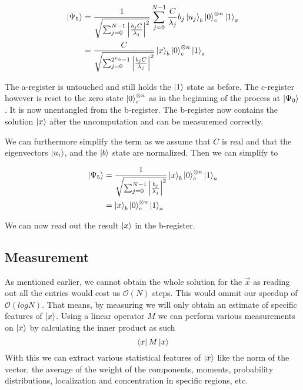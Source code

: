 \begin{equation}
\begin{split}
\ket{\Psi_5} &= \frac {1} {\sqrt{\sum_{j=0}^{N-1} \left| \frac{b_jC} {\lambda_j}\right|^2}}
\sum_{j=0}^{N-1}\frac{ C}{\lambda_j}   b_j \ket{u_j}_b \ket{0}_c^{\otimes n} \ket{1}_a\\
&= \frac {C} {\sqrt{\sum_{j=0}^{2^{n_b}-1} \left| \frac{b_jC} {\lambda_j}\right|^2}}
\ket{x}_b \ket{0}^{\otimes n}_c \ket{1}_a
\end{split}
\end{equation}

The a-register is untouched and still holds the $\ket 1$ state as before. 
The c-register however is reset to the zero state $\ket{0}^{\otimes n}_c$ as in the beginning of the process at $\ket {\Psi_0}$. 
It is now unentangled from the b-register.
The b-register now contains the solution $\ket x$ after the uncomputation and can be measuremed correctly.

We can furthermore simplify the term as we assume that  $C$ is real and that the eigenvectors $\ket{u_i}$, and the $\ket b$ state are normalized.
Then we can simplify to 

\begin{equation}
\begin{split}
\ket{\Psi_5} &= \frac {1} {\sqrt{\sum_{j=0}^{N-1} \left| \frac{b_j} {\lambda_j}\right|^2}}
\ket{x}_b \ket{0}^{\otimes n}_c \ket{1}_a\\
&= \ket{x}_b \ket{0}^{\otimes n}_c \ket{1}_a
\end{split}
\end{equation}

We can now  read out the result $\ket x$ in the b-register.

\subsection{Measurement}
As mentioned earlier, we cannot obtain the whole solution for the $\vec x$ as reading out all the entries would cost us $\mathcal{O}(N)$ steps.
This would ommit our speedup of $\mathcal{O}(log N)$. 
That means, by measuring we will only obtain an estimate of specific features of $\ket x$.
Using a linear operator $M$ we can perform various measurements on $\ket x$ by calculating the inner product as such
\begin{equation}
    \bra x M \ket x
\end{equation}
With this we can extract various statistical features of $\ket x$ like the norm of the vector, the average of the weight of the components, moments, probability distributions, localization and concentration in specific regions, etc.


























